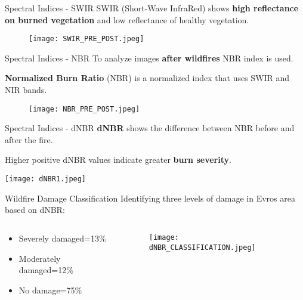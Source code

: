 \documentclass{beamer}
\begin{document}
\begin{frame}{Spectral Indices -  SWIR}
SWIR (Short-Wave InfraRed) shows \textbf{high reflectance on burned vegetation} and low reflectance of healthy vegetation.

 \bigskip
 
 \begin{figure}
    \centering
    \texttt{[image: SWIR\_PRE\_POST.jpeg]}
   \end{figure}
\end{frame}

\begin{frame}{Spectral Indices - NBR}
 To analyze images \textbf{after wildfires} NBR index is used.
 
 \textbf{Normalized Burn Ratio} (NBR) is a normalized index that uses SWIR and NIR bands.

 \begin{figure}
    \centering
    \texttt{[image: NBR\_PRE\_POST.jpeg]}
   \end{figure}
\end{frame}

\begin{frame}{Spectral Indices - dNBR}
\textbf{dNBR} shows the difference between NBR before and after the fire.

\bigskip
Higher positive dNBR values indicate greater \textbf{burn severity}.

\begin{center}
     \centering
     \texttt{[image: dNBR1.jpeg]}
 \end{center} 
\end{frame}

\begin{frame}{Wildfire Damage Classification}
 \centering Identifying three levels of damage in Evros area based on dNBR:
 
 \begin{columns}
    \begin{column}[t]{0.30\textwidth}
       \centering
       \bigskip
       \bigskip
        \begin{itemize}
         \item Severely damaged=13\%
         \item Moderately damaged=12\%
         \item No damage=75\%
         \end{itemize}
    \end{column} 

    \begin{column}[t]{0.80\textwidth}
            \centering
            \begin{figure}
            \texttt{[image: dNBR\_CLASSIFICATION.jpeg]}  
            \end{figure}
    \end{column} 
\end{columns}
\end{frame}
\end{document}
